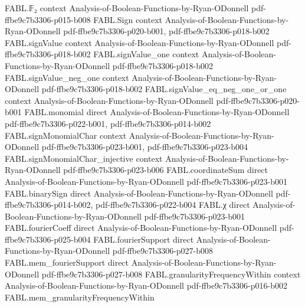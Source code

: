 \begin{theorem}
\label{FABL.exists_expect_abs_linearForm_sub_sqrt_two_div_pi_le_of_regular}
\leanok
{}
\proofstep
  {FABL.𝔽₂}
  {context}
  {Analysis-of-Boolean-Functions-by-Ryan-ODonnell}
  {pdf-ffbe9c7b3306-p015-b008}
\proofstep
  {FABL.Sign}
  {context}
  {Analysis-of-Boolean-Functions-by-Ryan-ODonnell}
  {pdf-ffbe9c7b3306-p020-b001,
    pdf-ffbe9c7b3306-p018-b002}
\proofstep
  {FABL.signValue}
  {context}
  {Analysis-of-Boolean-Functions-by-Ryan-ODonnell}
  {pdf-ffbe9c7b3306-p018-b002}
\proofstep
  {FABL.signValue_one}
  {context}
  {Analysis-of-Boolean-Functions-by-Ryan-ODonnell}
  {pdf-ffbe9c7b3306-p018-b002}
\proofstep
  {FABL.signValue_neg_one}
  {context}
  {Analysis-of-Boolean-Functions-by-Ryan-ODonnell}
  {pdf-ffbe9c7b3306-p018-b002}
\proofstep
  {FABL.signValue_eq_neg_one_or_one}
  {context}
  {Analysis-of-Boolean-Functions-by-Ryan-ODonnell}
  {pdf-ffbe9c7b3306-p020-b001}
\proofstep
  {FABL.monomial}
  {direct}
  {Analysis-of-Boolean-Functions-by-Ryan-ODonnell}
  {pdf-ffbe9c7b3306-p022-b001,
    pdf-ffbe9c7b3306-p014-b002}
\proofstep
  {FABL.signMonomialChar}
  {context}
  {Analysis-of-Boolean-Functions-by-Ryan-ODonnell}
  {pdf-ffbe9c7b3306-p023-b001,
    pdf-ffbe9c7b3306-p023-b004}
\proofstep
  {FABL.signMonomialChar_injective}
  {context}
  {Analysis-of-Boolean-Functions-by-Ryan-ODonnell}
  {pdf-ffbe9c7b3306-p023-b006}
\proofstep
  {FABL.coordinateSum}
  {direct}
  {Analysis-of-Boolean-Functions-by-Ryan-ODonnell}
  {pdf-ffbe9c7b3306-p023-b001}
\proofstep
  {FABL.binarySign}
  {direct}
  {Analysis-of-Boolean-Functions-by-Ryan-ODonnell}
  {pdf-ffbe9c7b3306-p014-b002,
    pdf-ffbe9c7b3306-p022-b004}
\proofstep
  {FABL.χ}
  {direct}
  {Analysis-of-Boolean-Functions-by-Ryan-ODonnell}
  {pdf-ffbe9c7b3306-p023-b001}
\proofstep
  {FABL.fourierCoeff}
  {direct}
  {Analysis-of-Boolean-Functions-by-Ryan-ODonnell}
  {pdf-ffbe9c7b3306-p025-b004}
\proofstep
  {FABL.fourierSupport}
  {direct}
  {Analysis-of-Boolean-Functions-by-Ryan-ODonnell}
  {pdf-ffbe9c7b3306-p027-b008}
\proofstep
  {FABL.mem_fourierSupport}
  {direct}
  {Analysis-of-Boolean-Functions-by-Ryan-ODonnell}
  {pdf-ffbe9c7b3306-p027-b008}
\proofstep
  {FABL.granularityFrequencyWithin}
  {context}
  {Analysis-of-Boolean-Functions-by-Ryan-ODonnell}
  {pdf-ffbe9c7b3306-p016-b002}
\proofstep
  {FABL.mem_granularityFrequencyWithin}

\end{theorem}
